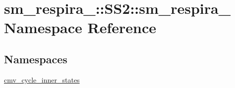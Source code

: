 \hypertarget{namespacesm__respira__1_1_1SS2_1_1sm__respira__1}{}\section{sm\+\_\+respira\+\_\+:\+:S\+S2\+:\+:sm\+\_\+respira\+\_ Namespace Reference}
\label{namespacesm__respira__1_1_1SS2_1_1sm__respira__1}
\subsection*{Namespaces}
\begin{DoxyCompactItemize}
\item 
 \hyperlink{namespacesm__respira__1_1_1SS2_1_1sm__respira__1_1_1cmv__cycle__inner__states}{cmv\+\_\+cycle\+\_\+inner\+\_\+states}
\end{DoxyCompactItemize}
